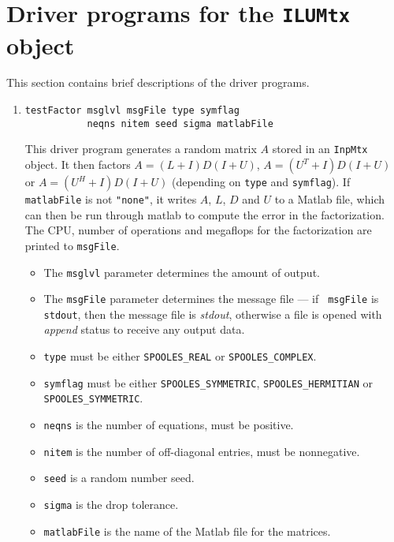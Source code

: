 \par
\section{Driver programs for the {\tt ILUMtx} object}
\label{section:ILUMtx:drivers}
\par
This section contains brief descriptions of the driver programs.
\par
\begin{enumerate}
\item
\begin{verbatim}
testFactor msglvl msgFile type symflag 
           neqns nitem seed sigma matlabFile
\end{verbatim}
This driver program generates a random matrix $A$ stored in
an {\tt InpMtx} object.
It then factors $A = (L+I)D(I+U)$, $A = (U^T+I)D(I+U)$ or
$A = (U^H+I)D(I+U)$ (depending on {\tt type} and {\tt symflag}).
If {\tt matlabFile} is not {\tt "none"},
it writes $A$, $L$, $D$ and $U$ to a Matlab file,
which can then be run through matlab to compute the error in
the factorization.
The CPU, number of operations and megaflops for the factorization
are printed to {\tt msgFile}.
\par
\begin{itemize}
\item
The {\tt msglvl} parameter determines the amount of output.
\item
The {\tt msgFile} parameter determines the message file --- if {\tt
msgFile} is {\tt stdout}, then the message file is {\it stdout},
otherwise a file is opened with {\it append} status to receive any
output data.
\item
{\tt type} must be either 
{\tt SPOOLES\_REAL} or
{\tt SPOOLES\_COMPLEX}.
\item
{\tt symflag} must be either 
{\tt SPOOLES\_SYMMETRIC},
{\tt SPOOLES\_HERMITIAN} or
{\tt SPOOLES\_SYMMETRIC}.
\item
{\tt neqns} is the number of equations, must be positive.
\item
{\tt nitem} is the number of off-diagonal entries, must be nonnegative.
\item
{\tt seed} is a random number seed.
\item
{\tt sigma} is the drop tolerance.
\item
{\tt matlabFile} is the name of the Matlab file for the matrices. 

\end{itemize}
\end{enumerate}
